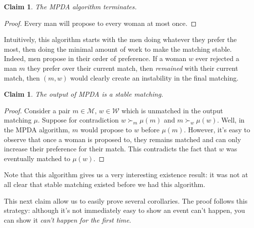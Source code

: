 \documentclass[12pt]{article}
\newcommand{\M}{\mathcal{M}}
\newcommand{\W}{\mathcal{W}}
\newtheorem{claim}[definition]{Claim}
\begin{document}
  \begin{claim}
    The MPDA algorithm terminates.
  \end{claim}
  \begin{proof}
    Every man will propose to every woman at most once.
  \end{proof}

  Intuitively, this algorithm starts with the men doing whatever they prefer
  the most, then doing the minimal amount of work to make the matching stable.
  Indeed, men propose in their order of preference. If a woman $w$ ever
  rejected a man $m$ they prefer over their current match,
  then \emph{remained} with their current match,
  then $(m,w)$ would clearly create an instability in the final matching.

  \begin{claim}
    The output of MPDA is a stable matching.
  \end{claim}
  \begin{proof}
    Consider a pair $m\in \M$, $w\in \W$ which is unmatched in the output matching
    $\mu$. Suppose for contradiction $w\succ_m \mu(m)$ and $m\succ_w \mu(w)$.
    Well, in the MPDA algorithm, $m$ would propose to $w$ before $\mu(m)$.
    However, it's easy to observe that once a woman is proposed to,
    they remains matched and can only increase their preference for their match.
    This contradicts the fact that $w$ was eventually matched to $\mu(w)$.
  \end{proof}

  Note that this algorithm gives us a very interesting existence result: it was
  not at all clear that stable matching existed before we had this algorithm.

  This next claim allow us to easily prove several corollaries.
  The proof follows this strategy: although it's not immediately easy to show an
  event can't happen, you can show it \emph{can't happen for the first time}.
\end{document}
